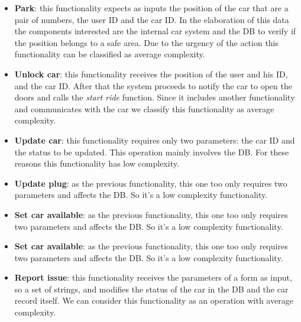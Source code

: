 \documentclass[english]{article}
\begin{document}
\begin{itemize}
	\item{\textbf{Park}: this functionality expects as inputs the position of the car that are a pair of numbers, the user ID and the car ID. In the elaboration of this data the components interested are the internal car system and the DB to verify if the position belongs to a safe area. Due to the urgency of the action this functionality can be classified as average complexity.}

	\item{\textbf{Unlock car}: this functionality receives the position of the user and his ID, and the car ID. After that the system proceeds to notify the car to open the doors and calls the \textit{start ride} function. Since it includes another functionality and communicates with the car we classify this functionality as average complexity.}

	\item{\textbf{Update car}: this functionality requires only two parameters: the car ID and the status to be updated. This operation mainly involves the DB. For these reasons this functionality has low complexity.}

	\item{\textbf{Update plug}: as the previous functionality, this one too only requires two parameters and affects the DB. So it's a low complexity functionality.}

	\item{\textbf{Set car available}: as the previous functionality, this one too only requires two parameters and affects the DB. So it's a low complexity functionality.}

	\item{\textbf{Set car available}: as the previous functionality, this one too only requires two parameters and affects the DB. So it's a low complexity functionality.}

	\item{\textbf{Report issue}: this functionality receives the parameters of a form as input, so a set of strings, and modifies the status of the car in the DB and the car record itself. We can consider this functionality as an operation with average complexity.}
\end{itemize}
\end{document}
